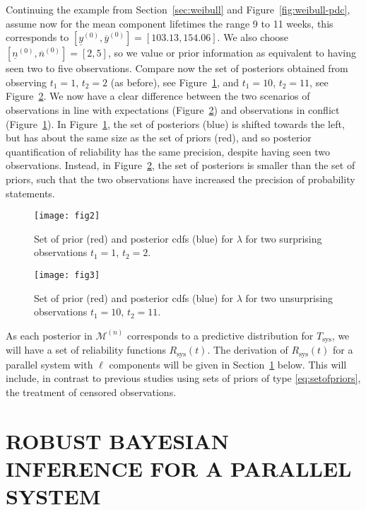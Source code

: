 \documentclass[12pt,a4paper,twocolumn,fleqn]{narms}
\newcommand{\uz}{^{(0)}} %
\newcommand{\un}{^{(n)}} %
\newcommand{\ul}[1]{\underline{#1}}
\newcommand{\ol}[1]{\overline{#1}}
\def\yzl{\ul{y}\uz}
\def\yzu{\ol{y}\uz}
\def\nzl{\ul{n}\uz}
\def\nzu{\ol{n}\uz}
\def\MN{\mathcal{M}\un}
\newcommand{\comments}[1]{{\small\color{gray} #1}}
\begin{document}
Continuing the example from Section~\ref{sec:weibull} and Figure~\ref{fig:weibull-pdc},
assume now for the mean component lifetimes the range 9 to 11 weeks,
this corresponds to $[\yzl,\yzu] = [103.13, 154.06]$.
We also choose $[\nzl,\nzu] =[2, 5]$,
so we value or prior information as equivalent to having seen two to five observations.
Compare now the set of posteriors obtained from observing
$t_1 = 1$, $t_2 = 2$ (as before), see Figure~\ref{fig:setofpost-pdc},
and $t_1 = 10$, $t_2 = 11$, see Figure~\ref{fig:setofpost-nopdc}.
We now have a clear difference between the two scenarios of
observations in line with expectations (Figure~\ref{fig:setofpost-nopdc})
and observations in conflict (Figure~\ref{fig:setofpost-pdc}).
In Figure~\ref{fig:setofpost-pdc}, the set of posteriors (blue)
is shifted towards the left, but has about the same size as the set of priors (red),
and so posterior quantification of reliability has the same precision,
despite having seen two observations.
Instead, in Figure~\ref{fig:setofpost-nopdc}, the set of posteriors
is smaller than the set of priors,
such that the two observations have increased the precision of probability statements.

\begin{figure}
\texttt{[image: fig2]}
\caption{Set of prior (red) and posterior cdfs (blue) for $\lambda$ for two surprising observations $t_1 = 1$, $t_2 = 2$.}
\label{fig:setofpost-pdc}
\end{figure}

\begin{figure}
\texttt{[image: fig3]}
\caption{Set of prior (red) and posterior cdfs (blue) for $\lambda$ for two unsurprising observations $t_1 = 10$, $t_2 = 11$.}
\label{fig:setofpost-nopdc}
\end{figure}

%
As each posterior in $\MN$ corresponds to a predictive distribution for $T_\text{sys}$,
we will have a set of reliability functions $R_\text{sys}(t)$.
The derivation of $R_\text{sys}(t)$ for a parallel system with $\ell$ components
will be given in Section~\ref{sec:andrewsresults} below.
This will include, in contrast to previous studies using sets of priors of type 
\eqref{eq:setofpriors}, the treatment of censored observations.


\section{ROBUST BAYESIAN INFERENCE FOR A PARALLEL SYSTEM}
\label{sec:andrewsresults}
\end{document}
